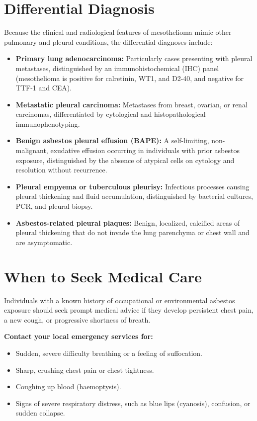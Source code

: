 \section*{Differential Diagnosis}
Because the clinical and radiological features of mesothelioma mimic other pulmonary and pleural conditions, the differential diagnoses include:
\begin{itemize}
    \item \textbf{Primary lung adenocarcinoma:} Particularly cases presenting with pleural metastases, distinguished by an immunohistochemical (IHC) panel (mesothelioma is positive for calretinin, WT1, and D2-40, and negative for TTF-1 and CEA).
    \item \textbf{Metastatic pleural carcinoma:} Metastases from breast, ovarian, or renal carcinomas, differentiated by cytological and histopathological immunophenotyping.
    \item \textbf{Benign asbestos pleural effusion (BAPE):} A self-limiting, non-malignant, exudative effusion occurring in individuals with prior asbestos exposure, distinguished by the absence of atypical cells on cytology and resolution without recurrence.
    \item \textbf{Pleural empyema or tuberculous pleurisy:} Infectious processes causing pleural thickening and fluid accumulation, distinguished by bacterial cultures, PCR, and pleural biopsy.
    \item \textbf{Asbestos-related pleural plaques:} Benign, localized, calcified areas of pleural thickening that do not invade the lung parenchyma or chest wall and are asymptomatic.
\end{itemize}

\section*{When to Seek Medical Care}
Individuals with a known history of occupational or environmental asbestos exposure should seek prompt medical advice if they develop persistent chest pain, a new cough, or progressive shortness of breath.

\textbf{Contact your local emergency services for:}
\begin{itemize}
    \item Sudden, severe difficulty breathing or a feeling of suffocation.
    \item Sharp, crushing chest pain or chest tightness.
    \item Coughing up blood (haemoptysis).
    \item Signs of severe respiratory distress, such as blue lips (cyanosis), confusion, or sudden collapse.
\end{itemize}


